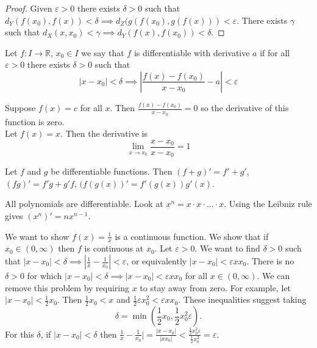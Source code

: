 \documentclass{article}
\newcommand{\R}{\mathbb{R}}
\newcommand{\eps}{\varepsilon}
\newcommand{\ra}[1][]{\xrightarrow{#1}}
\begin{document}
\begin{proof}
Given $\eps>0$ there exists $\delta>0$ such that $d_Y(f(x_0),f(x))<\delta\implies d_Z(g(f(x_0),g(f(x)))<\eps$. There exists $\gamma$ such that $d_X(x,x_0)<\gamma\implies d_Y(f(x),f(x_0))<\delta$.
\end{proof}
\begin{definition}
Let $f:I\ra\R$, $x_0\in I$ we say that $f$ is differentiable with derivative $a$ if for all $\eps>0$ there exists $\delta>0$ such that $$|x-x_0|<\delta\implies\left|\frac{f(x)-f(x_0)}{x-x_0}-a\right|<\eps$$
\end{definition}
\begin{example}
Suppose $f(x)=c$ for all $x$. Then $\frac{f(x)-f(x_0)}{x-x_0}=0$   so the derivative of this function is zero.\\
Let $f(x)=x$. Then the derivative is $$\lim_{x\ra x_0}\frac{x-x_0}{x-x_0}=1$$
\end{example}
\begin{lemma}
Let $f$ and $g$ be differentiable functions. Then $(f+g)'=f'+g'$, $(fg)'=f'g+g'f$, $(f(g(x))'=f'(g(x))g'(x)$.
\end{lemma}
\begin{example}
All polynomials are differentiable. Look at $x^n=x\cdot x\cdot...\cdot x$. Using the Leibniz rule gives $(x^n)'=nx^{n-1}$.
\end{example}
\begin{example}
We want to show $f(x)=\frac{1}{x}$ is a continuous function. We show that if $x_0\in(0,\infty)$ then $f$ is continuous at $x_0$. Let $\eps>0$. We want to find $\delta>0$  such that $|x-x_0|<\delta\implies |\frac{1}{x}-\frac{1}{x_0}|<\eps$, or equivalently $|x-x_0|<\eps xx_0$. There is no $\delta>0$ for which $|x-x_0|<\delta\implies |x-x_0|<\eps xx_0$ for all $x\in(0,\infty)$. We can remove this problem by requiring $x$ to stay away from zero. For example, let $|x-x_0|<\frac{1}{2}x_0$. Then $\frac{1}{2}x_0<x$ and $\frac{1}{2}\eps x_0^2<\eps xx_0$. These inequalities suggest taking $$\delta=\min\left(\frac{1}{2}x_0,\frac{1}{2}x_0^2\eps\right).$$ For this $\delta$, if $|x-x_0|<\delta$ then $\frac{1}{x}-\frac{1}{x_0}|=\frac{|x-x_0|}{|xx_0|}<\frac{\frac{1}{2}x_0^2\eps}{\frac{1}{2}x_0^2}=\eps$.
\end{example}
\end{document}
